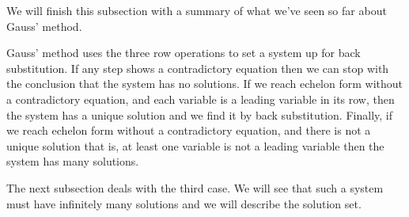 We will finish this subsection with a summary of
what we've seen so far about Gauss' method.

Gauss' method uses the three row operations to 
set a system up for back substitution.
If any step shows a contradictory equation then we can stop with the
conclusion that the system has no solutions.
If we reach echelon form without a contradictory equation,
and each variable is a leading variable in its
row, then the system has a unique solution and we find it by
back substitution.
Finally, if we reach echelon form without a contradictory equation,
and there is not a unique solution\Dash
that is, at least one variable is not a leading variable\Dash
then the system has many solutions.

The next subsection deals with the third case.
We will see that such a system must have infinitely many solutions
and we will describe the
solution set.


